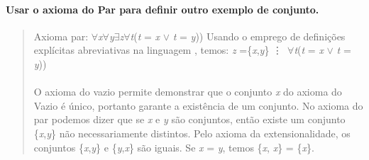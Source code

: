 
\paragraph{Usar o axioma do Par para definir outro exemplo de conjunto.}
\begin{quote}

	Axioma par: $\forall$\textit{x}$\forall$\textit{y}$\exists$\textit{z}$\forall$\textit{t}(\textit{t} = \textit{x} $\lor$ \textit{t} = \textit{y}))
	\newline
	Usando o emprego de definições explícitas abreviativas na linguagem , temos:
	\newline
	\textit{z} =\{{\textit{x},\textit{y}}\}  \vdots \, $\forall$\textit{t}(\textit{t} = \textit{x} $\lor$ \textit{t} = \textit{y}))	
	
	\paragraph{}
	O axioma do vazio permite demonstrar que o conjunto \textit{x} do axioma do Vazio é único, portanto garante a existência de um conjunto. No axioma do par podemos dizer que se \textit{x} e \textit{y} são conjuntos, então existe um conjunto \{\textit{x},\textit{y}\} não necessariamente distintos. Pelo axioma da extensionalidade, os conjuntos \{\textit{x},\textit{y}\} e \{\textit{y},\textit{x}\} são iguais. Se \textit{x} = \textit{y}, temos \{\textit{x}, \textit{x}\} = \{\textit{x}\}.
	
	
\end{quote}
